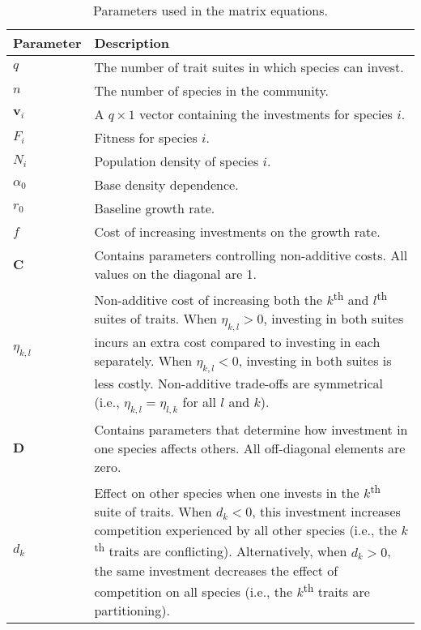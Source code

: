\begin{table}[!ht]
    \centering
    \singlespacing
    \renewcommand{\arraystretch}{1.5}
    \begin{tabular}{lp{5in}}
    \toprule
    Parameter & Description \\
    \midrule
    $q$ & The number of trait suites in which species can invest. \\
    $n$ & The number of species in the community. \\
    $\mathbf{v}_i$ & A $q \times 1$ vector containing the  investments for
        species $i$. \\
    $F_i$ & Fitness for species $i$. \\
    $N_i$ & Population density of species $i$. \\
    $\alpha_0$ & Base density dependence. \\
    $r_0$ & Baseline growth rate. \\
    $f$ & Cost of increasing investments on the growth rate. \\
    $\mathbf{C}$ & Contains parameters controlling non-additive costs.
        All values on the diagonal are 1. \\
    $\eta_{k,l}$ & Non-additive cost of increasing both the
        $k$\textsuperscript{th} and $l$\textsuperscript{th} suites of traits.
        When $\eta_{k,l} > 0$, investing in both suites incurs an extra cost
        compared to investing in each separately.
        When $\eta_{k,l} < 0$, investing in both suites is less costly.
        Non-additive trade-offs are symmetrical (i.e., $\eta_{k,l} = \eta_{l,k}$
        for all $l$ and $k$). \\
    $\mathbf{D}$ & Contains parameters that determine how investment in one
        species affects others. All off-diagonal elements are zero. \\
    $d_k$ & Effect on other species when one invests in the
        $k$\textsuperscript{th} suite of traits. 
        When $d_k < 0$, this investment increases competition experienced by 
        all other species (i.e., the $k$\textsuperscript{th} traits 
        are conflicting). 
        Alternatively, when $d_k > 0$, the same investment decreases the 
        effect of competition on all species (i.e., the $k$\textsuperscript{th}
        traits are partitioning). \\
    \bottomrule
    \end{tabular}
    \caption{Parameters used in the matrix equations.}
    \label{tab:matrix-parameters-table}
\end{table}


